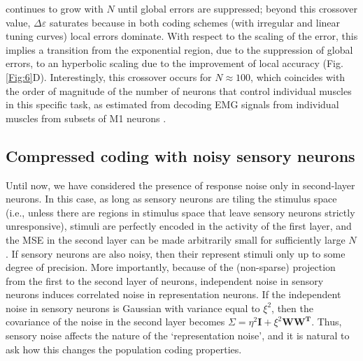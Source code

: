 \documentclass[a4paper]{article}%
\begin{document}
continues to grow with $N$ until global errors are suppressed; beyond
this crossover value, $\Delta\varepsilon$ saturates because in both coding
schemes (with irregular and linear tuning curves)  local
errors dominate. With respect to  the scaling of the error, this implies a transition from the exponential region, due to the suppression of global errors, to an hyperbolic scaling due to the improvement of local accuracy (Fig. \ref{Fig:6}D). Interestingly, this crossover occurs for $N\approx100$, which coincides
with the order of magnitude of the number of neurons that control individual
muscles in this specific task, as estimated from decoding EMG signals from
individual muscles from subsets of M1 neurons
\cite[]{Lalazar2016TuningConnectivity}. 

\subsection{Compressed coding with noisy sensory neurons}

\label{SuSe:In}

Until now, we have considered the presence of response noise only in
second-layer neurons. In this case, as long as sensory neurons are tiling the
stimulus space (i.e., unless there are regions in stimulus space that leave
sensory neurons strictly unresponsive), stimuli are perfectly encoded in the
activity of the first layer, and the MSE in the second layer can be made
arbitrarily small for sufficiently large \thinspace$N$.  If
sensory neurons are also noisy, then their represent stimuli only up to some
degree of precision. More importantly, because of the (non-sparse) projection
from the first to the second layer of neurons, independent noise in sensory
neurons induces correlated noise in representation neurons. If the independent
noise in sensory neurons is Gaussian with variance equal to $\xi^{2}$, then
the covariance of the noise in the second layer becomes $\Sigma=\eta
^{2}\mathbf{I}+\xi^{2}\mathbf{WW^{T}}$. Thus, sensory noise affects the nature
of the `representation noise', and it is natural to ask how this changes the
population coding properties.
\end{document}
